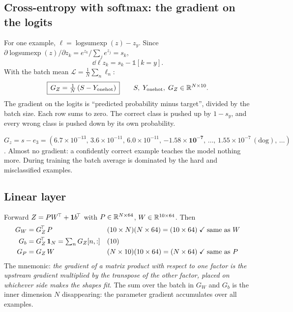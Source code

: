 \subsection{Cross-entropy with softmax: the gradient on the logits}
\label{sec:cegrad}

\begin{idea}[derivation]
For one example, $\ell = \operatorname{logsumexp}(z) - z_y$. Since $\partial\operatorname{logsumexp}(z)/\partial z_k = e^{z_k}/\sum_je^{z_j} = s_k$,
\[
  \dd{\ell}{z_k} = s_k - \mathbb 1[k=y].
\]
With the batch mean $\mathcal L=\frac1N\sum_n\ell_n$:
\[
  \boxed{\,G_Z = \tfrac1N\,(S - Y_\text{onehot})\,}\qquad S,\;Y_\text{onehot},\;G_Z\in\mathbb{R}^{N\times10}.
\]
The gradient on the logits is ``predicted probability minus target'', divided by the batch size. Each row sums to zero. The correct class is pushed up by $1-s_y$, and every wrong class is pushed down by its own probability.
\end{idea}

\begin{repo}[on \texttt{test0.png}, $N=1$]
$G_z = s - e_3 = (6.7{\times}10^{-13},\,3.6{\times}10^{-11},\,6.0{\times}10^{-11},\,\mathbf{-1.58{\times}10^{-7}},\,\dots,\,1.55{\times}10^{-7}\,(\text{dog}),\,\dots)$. Almost no gradient: a confidently correct example teaches the model nothing more. During training the batch average is dominated by the hard and misclassified examples.
\end{repo}

\subsection{Linear layer}

\begin{idea}
Forward $Z = PW^{\!\top} + \mathbf 1 b^{\!\top}$ with $P\in\mathbb{R}^{N\times64}$, $W\in\mathbb{R}^{10\times64}$. Then
\begin{align*}
  G_W &= G_Z^{\!\top}\,P &&(10\times N)(N\times64) = (10\times64) \;\checkmark\;\text{same as }W\\
  G_b &= G_Z^{\!\top}\,\mathbf 1_N = \textstyle\sum_n G_Z[n,:] &&(10)\\
  G_P &= G_Z\,W &&(N\times10)(10\times64) = (N\times64)\;\checkmark\;\text{same as }P
\end{align*}
The mnemonic: \emph{the gradient of a matrix product with respect to one factor is the upstream gradient multiplied by the transpose of the other factor, placed on whichever side makes the shapes fit}. The sum over the batch in $G_W$ and $G_b$ is the inner dimension $N$ disappearing: the parameter gradient accumulates over all examples.
\end{idea}

